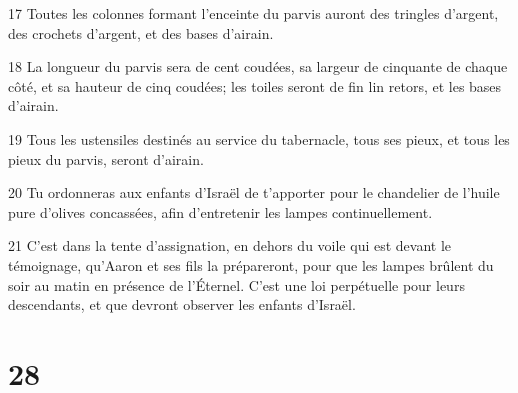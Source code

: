 \par 17 Toutes les colonnes formant l'enceinte du parvis auront des tringles d'argent, des crochets d'argent, et des bases d'airain.
\par 18 La longueur du parvis sera de cent coudées, sa largeur de cinquante de chaque côté, et sa hauteur de cinq coudées; les toiles seront de fin lin retors, et les bases d'airain.
\par 19 Tous les ustensiles destinés au service du tabernacle, tous ses pieux, et tous les pieux du parvis, seront d'airain.
\par 20 Tu ordonneras aux enfants d'Israël de t'apporter pour le chandelier de l'huile pure d'olives concassées, afin d'entretenir les lampes continuellement.
\par 21 C'est dans la tente d'assignation, en dehors du voile qui est devant le témoignage, qu'Aaron et ses fils la prépareront, pour que les lampes brûlent du soir au matin en présence de l'Éternel. C'est une loi perpétuelle pour leurs descendants, et que devront observer les enfants d'Israël.

\chapter{28}

